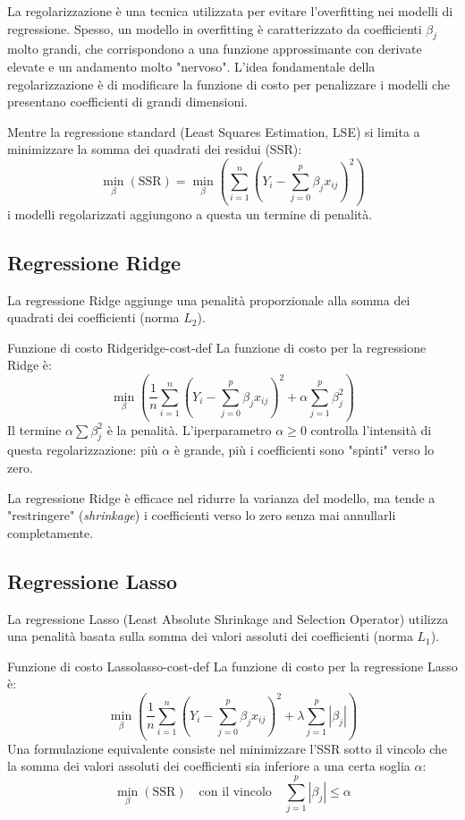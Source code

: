 La regolarizzazione è una tecnica utilizzata per evitare l'overfitting nei
modelli di regressione. Spesso, un modello in overfitting è caratterizzato da
coefficienti \(\beta_j\) molto grandi, che corrispondono a una funzione
approssimante con derivate elevate e un andamento molto "nervoso". L'idea
fondamentale della regolarizzazione è di modificare la funzione di costo per
penalizzare i modelli che presentano coefficienti di grandi dimensioni.

Mentre la regressione standard (Least Squares Estimation, LSE) si limita a
minimizzare la somma dei quadrati dei residui (SSR):
\[
    \min_{\beta} \left( \text{SSR} \right) = \min_{\beta} \left( \sum_{i=1}^{n}
    (Y_i - \sum_{j=0}^{p} \beta_j x_{ij})^2 \right)
\]
i modelli regolarizzati aggiungono a questa un termine di penalità.

\subsection{Regressione Ridge}
La regressione Ridge aggiunge una penalità proporzionale alla somma dei
quadrati dei coefficienti (norma \(L_2\)).

\begin{definizione}{Funzione di costo Ridge}{ridge-cost-def}
La funzione di costo per la regressione Ridge è:
\begin{equation*}
    \min_{\beta} \left( \frac{1}{n}\sum_{i=1}^{n} (Y_i - \sum_{j=0}^{p} \beta_jx_{ij})^2 + \alpha \sum_{j=1}^{p} \beta_j^2 \right)
\end{equation*}
Il termine \(\alpha \sum \beta_j^2\) è la penalità. L'iperparametro \(\alpha \ge 0\)
controlla l'intensità di questa regolarizzazione: più \(\alpha\) è
grande, più i coefficienti sono "spinti" verso lo zero.
\end{definizione}

La regressione Ridge è efficace nel ridurre la varianza del modello, ma tende a
"restringere" (\textit{shrinkage}) i coefficienti verso lo zero senza mai
annullarli completamente.

\subsection{Regressione Lasso}
La regressione Lasso (Least Absolute Shrinkage and Selection Operator) utilizza
una penalità basata sulla somma dei valori assoluti dei coefficienti (norma
\(L_1\)).

\begin{definizione}{Funzione di costo Lasso}{lasso-cost-def}
La funzione di costo per la regressione Lasso è:
\[
    \min_{\beta} \left( \frac{1}{n}\sum_{i=1}^{n} (Y_i - \sum_{j=0}^{p} \beta_j
    x_{ij})^2 + \lambda \sum_{j=1}^{p} |\beta_j| \right)
\]
Una formulazione equivalente consiste nel minimizzare l'SSR sotto il vincolo che
la somma dei valori assoluti dei coefficienti sia inferiore a una certa soglia
\(\alpha\):
\[
    \min_{\beta}(\text{SSR}) \quad \text{con il vincolo} \quad \sum_{j=1}^{p}
    |\beta_j| \le \alpha
\]
\end{definizione}

